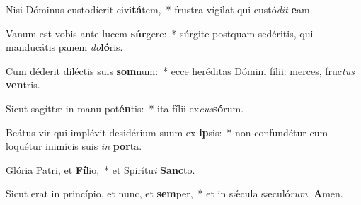 Nisi Dóminus custodíerit civi\textbf{tá}tem,~* frustra vígilat qui custó\textit{dit} \textbf{e}am.

Vanum est vobis ante lucem \textbf{súr}gere:~* súrgite postquam sedéritis, qui manducátis panem \textit{do}\textbf{ló}ris.

Cum déderit diléctis suis \textbf{som}num:~* ecce heréditas Dómini fílii: merces, fruc\textit{tus} \textbf{ven}tris.

Sicut sagíttæ in manu pot\textbf{én}tis:~* ita fílii ex\textit{cus}\textbf{só}rum.

Beátus vir qui implévit desidérium suum ex \textbf{ip}sis:~* non confundétur cum loquétur inimícis suis \textit{in} \textbf{por}ta.

Glória Patri, et \textbf{Fí}lio,~* et Spirítu\textit{i} \textbf{Sanc}to.

Sicut erat in princípio, et nunc, et \textbf{sem}per,~* et in sǽcula sæculó\textit{rum}. \textbf{A}men.

